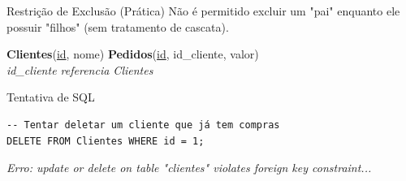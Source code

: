 \documentclass[9pt]{beamer}
\begin{document}
\begin{frame}[fragile]{Restrição de Exclusão (Prática)}
  \small
  Não é permitido excluir um "pai" enquanto ele possuir "filhos" (sem tratamento de cascata).
  \vspace{0.3cm}
  \centering
  \centering\scriptsize
  \textbf{Clientes}(\underline{id}, nome) \quad \textbf{Pedidos}(\underline{id}, \color{red}id\_cliente\color{black}, valor) \\
  \textit{id\_cliente referencia Clientes}
  \vspace{0.2cm}
  \begin{exampleblock}{Tentativa de SQL}
\begin{lstlisting}
-- Tentar deletar um cliente que já tem compras
DELETE FROM Clientes WHERE id = 1;
\end{lstlisting}
    \vspace{0.1cm}
    \color{red}\textit{Erro: update or delete on table "clientes" violates foreign key constraint...}
  \end{exampleblock}
\end{frame}
\end{document}
